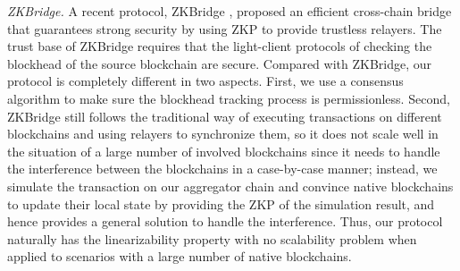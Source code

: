\smallskip\noindent\emph{ZKBridge.}
A recent protocol, ZKBridge \cite{xie2022zkbridge-zkbridge}, proposed an efficient cross-chain bridge that guarantees strong security by using ZKP to provide trustless relayers. The trust base of ZKBridge requires that the light-client protocols of checking the blockhead of the source blockchain are secure. Compared with ZKBridge, our protocol is completely different in two aspects. First, we use a consensus algorithm to make sure the blockhead tracking process is permissionless. Second, ZKBridge still follows the traditional way of executing transactions on different blockchains and using relayers to synchronize them, so it does not scale well in the situation of a large number of involved blockchains since it needs to handle the interference between the blockchains in a case-by-case manner; instead, we simulate the transaction on our aggregator chain and convince native blockchains to update their local state by providing the ZKP of the simulation result, and hence provides a general solution to handle the interference. Thus, our protocol naturally has the linearizability property with no scalability problem when applied to scenarios with a large number of native blockchains.

